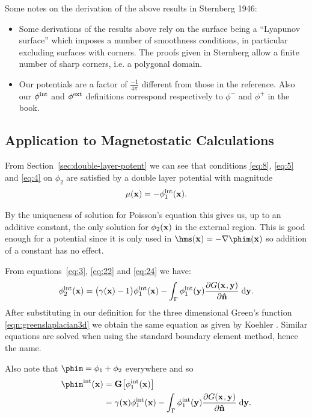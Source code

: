 Some notes on the derivation of the above results in Sternberg 1946\cite{Sternberg1946}:
\begin{itemize}
\item Some derivations of the results above rely on the surface being a ``Lyapunov surface'' which imposes a number of smoothness conditions, in particular excluding surfaces with corners.
The proofs given in Sternberg allow a finite number of sharp corners, i.e. a polygonal domain.
\item Our potentials are a factor of $\frac{-1}{4 \pi}$ different from those in the reference. Also our $\phi^{\text{int}}$ and $\phi^{\text{ext}}$ definitions correspond respectively to $\phi^-$ and $\phi^+$ in the book.
\end{itemize}

\subsection{Application to Magnetostatic Calculations}
From Section~\ref{sec:double-layer-potent} we can see that conditions \eqref{eq:8}, \eqref{eq:5} and \eqref{eq:4} on $\phi_2$ are satisfied by a double layer potential with magnitude
\begin{equation}
  \label{eq:24}
  \mu(\mathbf{x}) = - \phi^{\text{int}}_1(\mathbf{x}).
\end{equation}

By the uniqueness of solution for Poisson's equation this gives us, up to an additive constant, the only solution for $\phi_2(\mathbf{x})$ in the external region.
This is good enough for a potential since it is only used in $\hms(\xv) = - \nabla \phim(\xv)$ so addition of a constant has no effect.

From equations~\eqref{eq:3}, \eqref{eq:22} and \eqref{eq:24} we have:
\begin{equation}
  \label{eq:6}
  \phi^{\text{int}}_2(\mathbf{x}) =  \big(\gamma(\mathbf{x}) - 1 \big) \phi^{\text{int}}_1(\mathbf{x})
  - \int_{{\Gamma}} \phi^{\text{int}}_1(\mathbf{y}) \frac{\partial G(\mathbf{x}_{},\mathbf{y})}{\partial \mathbf{\hat{n}}} {\; \text{d}} \mathbf{y}.
\end{equation}
After substituting in our definition for the three dimensional Green's function \eqref{eqn:greenslaplacian3d} we obtain the same equation as given by Koehler \cite{Koehler1997}.
Similar equations are solved when using the standard boundary element method, hence the name.

Also note that $\phim = \phi_1 + \phi_2$ everywhere and so
\begin{align}
  \label{eq:18}
  \phim^\inte(\xv) &= \bm \big[ \phi^\inte_1(\xv) \big] \\
  &= \gamma(\xv) \phi^\inte_1(\xv)
  - \int_{\boundd} \phi^\inte_1(\yv) \pd{\Green}{\nv} \d \yv. \notag
\end{align}

